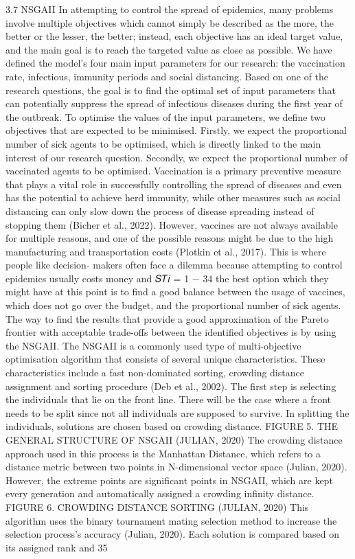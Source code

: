 \documentclass[smallextended]{svjour3}       %
\begin{document}
3.7 NSGAII
In attempting to control the spread of epidemics, many problems involve multiple objectives which cannot simply be described as the more, the better or the lesser, the better; instead, each objective has an ideal target value, and the main goal is to reach the targeted value as close as possible. We have defined the model's four main input parameters for our research: the vaccination rate, infectious, immunity periods and social distancing. Based on one of the research questions, the goal is to find the optimal set of input parameters that can potentially suppress the spread of infectious diseases during the first year of the outbreak. To optimise the values of the input parameters, we define two objectives that are expected to be minimised. Firstly, we expect the proportional number of sick agents to be optimised, which is directly linked to the main interest of our research question. Secondly, we expect the proportional number of vaccinated agents to be optimised. Vaccination is a primary preventive measure that plays a vital role in successfully controlling the spread of diseases and even has the potential to achieve herd immunity, while other measures such as social distancing can only slow down the process of disease spreading instead of stopping them (Bicher et al., 2022). However, vaccines are not always available for multiple reasons, and one of the possible reasons might be due to the high manufacturing and transportation costs (Plotkin et al., 2017). This is where people like decision- makers often face a dilemma because attempting to control epidemics usually costs money and
𝑆𝑇𝑖 = 1 −
 34
the best option which they might have at this point is to find a good balance between the usage of vaccines, which does not go over the budget, and the proportional number of sick agents. The way to find the results that provide a good approximation of the Pareto frontier with acceptable trade-offs between the identified objectives is by using the NSGAII. The NSGAII is a commonly used type of multi-objective optimisation algorithm that consists of several unique characteristics. These characteristics include a fast non-dominated sorting, crowding distance assignment and sorting procedure (Deb et al., 2002). The first step is selecting the individuals that lie on the front line. There will be the case where a front needs to be split since not all individuals are supposed to survive. In splitting the individuals, solutions are chosen based on crowding distance.
 FIGURE 5. THE GENERAL STRUCTURE OF NSGAII (JULIAN, 2020)
The crowding distance approach used in this process is the Manhattan Distance, which refers to a distance metric between two points in N-dimensional vector space (Julian, 2020). However, the extreme points are significant points in NSGAII, which are kept every generation and automatically assigned a crowding infinity distance.
 FIGURE 6. CROWDING DISTANCE SORTING (JULIAN, 2020)
This algorithm uses the binary tournament mating selection method to increase the selection process’s accuracy (Julian, 2020). Each solution is compared based on its assigned rank and
35
\end{document}

